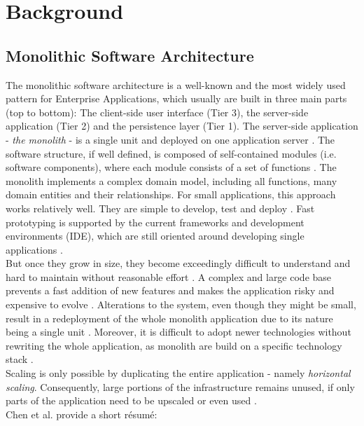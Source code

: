 \chapter{Background}
\label{ch:background}

\section{Monolithic Software Architecture}
\label{sec:background:monolith}
The monolithic software architecture is a well-known and the most widely used pattern for Enterprise Applications, which usually are built in three main parts (top to bottom): The client-side user interface (Tier 3), the server-side application (Tier 2) and the persistence layer (Tier 1). The server-side application - \textit{the monolith} - is a single unit and deployed on one application server \cite{infoq}. The software structure, if well defined, is composed of self-contained modules (i.e. software components), where each module consists of a set of functions \cite{HeuristicsAlwis}.
The monolith implements a complex domain model, including all functions, many domain entities and their relationships.
For small applications, this approach works relatively well. They are simple to develop, test and deploy \cite{FunctionalDecompositionHeinrich}. Fast prototyping is supported by the current frameworks and development environments (IDE), which are still oriented around developing single applications \cite{infoq}.
\\
But once they grow in size, they become exceedingly difficult to understand and hard to maintain without reasonable effort \cite{FunctionalDecompositionHeinrich} \cite{ClassificationOfRefactoring}. A complex and large code base prevents a fast addition of new features and makes the application risky and expensive to evolve \cite{TowardsTechnique}.
Alterations to the system, even though they might be small, result in a redeployment of the whole monolith application due to its nature being a single unit \cite{FunctionalDecompositionHeinrich}. Moreover, it is difficult to adopt newer technologies without rewriting the whole application, as monolith are build on a specific technology stack \cite{infoq} \cite{ExtractionMazlami}.\\
Scaling is only possible by duplicating the entire application  - namely \textit{horizontal scaling}. Consequently, large portions of the infrastructure remains unused, if only parts of the application need to be upscaled or even used \cite{EnticeApproach} \cite{MigratingTowardsSurvey}. \\
Chen et al. provide a short résumé:

